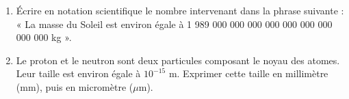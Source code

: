 
\begin{enumerate}
\item Écrire en notation scientifique le nombre intervenant dans la phrase suivante :
« La masse du Soleil est environ égale à 1 989 000 000 000 000 000 000 000 000 000 kg ».

\item Le proton et le neutron sont deux particules composant le noyau des atomes. Leur taille est environ égale à $10^{-15}$ m. Exprimer cette taille en millimètre (mm), puis en micromètre ($\mu$m).
\end{enumerate}